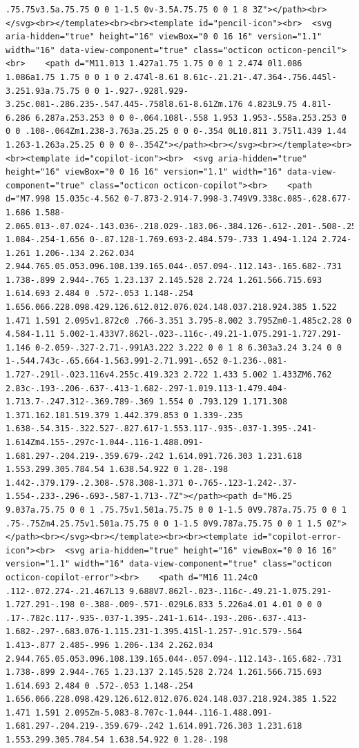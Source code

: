 \documentclass[
  letterpaper,
]{book}
\begin{document}
\begin{verbatim}
.75.75v3.5a.75.75 0 0 1-1.5 0v-3.5A.75.75 0 0 1 8 3Z"></path><br></svg><br></template><br><br><template id="pencil-icon"><br>  <svg aria-hidden="true" height="16" viewBox="0 0 16 16" version="1.1" width="16" data-view-component="true" class="octicon octicon-pencil"><br>    <path d="M11.013 1.427a1.75 1.75 0 0 1 2.474 0l1.086 1.086a1.75 1.75 0 0 1 0 2.474l-8.61 8.61c-.21.21-.47.364-.756.445l-3.251.93a.75.75 0 0 1-.927-.928l.929-3.25c.081-.286.235-.547.445-.758l8.61-8.61Zm.176 4.823L9.75 4.81l-6.286 6.287a.253.253 0 0 0-.064.108l-.558 1.953 1.953-.558a.253.253 0 0 0 .108-.064Zm1.238-3.763a.25.25 0 0 0-.354 0L10.811 3.75l1.439 1.44 1.263-1.263a.25.25 0 0 0 0-.354Z"></path><br></svg><br></template><br><br><template id="copilot-icon"><br>  <svg aria-hidden="true" height="16" viewBox="0 0 16 16" version="1.1" width="16" data-view-component="true" class="octicon octicon-copilot"><br>    <path d="M7.998 15.035c-4.562 0-7.873-2.914-7.998-3.749V9.338c.085-.628.677-1.686 1.588-2.065.013-.07.024-.143.036-.218.029-.183.06-.384.126-.612-.201-.508-.254-1.084-.254-1.656 0-.87.128-1.769.693-2.484.579-.733 1.494-1.124 2.724-1.261 1.206-.134 2.262.034 2.944.765.05.053.096.108.139.165.044-.057.094-.112.143-.165.682-.731 1.738-.899 2.944-.765 1.23.137 2.145.528 2.724 1.261.566.715.693 1.614.693 2.484 0 .572-.053 1.148-.254 1.656.066.228.098.429.126.612.012.076.024.148.037.218.924.385 1.522 1.471 1.591 2.095v1.872c0 .766-3.351 3.795-8.002 3.795Zm0-1.485c2.28 0 4.584-1.11 5.002-1.433V7.862l-.023-.116c-.49.21-1.075.291-1.727.291-1.146 0-2.059-.327-2.71-.991A3.222 3.222 0 0 1 8 6.303a3.24 3.24 0 0 1-.544.743c-.65.664-1.563.991-2.71.991-.652 0-1.236-.081-1.727-.291l-.023.116v4.255c.419.323 2.722 1.433 5.002 1.433ZM6.762 2.83c-.193-.206-.637-.413-1.682-.297-1.019.113-1.479.404-1.713.7-.247.312-.369.789-.369 1.554 0 .793.129 1.171.308 1.371.162.181.519.379 1.442.379.853 0 1.339-.235 1.638-.54.315-.322.527-.827.617-1.553.117-.935-.037-1.395-.241-1.614Zm4.155-.297c-1.044-.116-1.488.091-1.681.297-.204.219-.359.679-.242 1.614.091.726.303 1.231.618 1.553.299.305.784.54 1.638.54.922 0 1.28-.198 1.442-.379.179-.2.308-.578.308-1.371 0-.765-.123-1.242-.37-1.554-.233-.296-.693-.587-1.713-.7Z"></path><path d="M6.25 9.037a.75.75 0 0 1 .75.75v1.501a.75.75 0 0 1-1.5 0V9.787a.75.75 0 0 1 .75-.75Zm4.25.75v1.501a.75.75 0 0 1-1.5 0V9.787a.75.75 0 0 1 1.5 0Z"></path><br></svg><br></template><br><br><template id="copilot-error-icon"><br>  <svg aria-hidden="true" height="16" viewBox="0 0 16 16" version="1.1" width="16" data-view-component="true" class="octicon octicon-copilot-error"><br>    <path d="M16 11.24c0 .112-.072.274-.21.467L13 9.688V7.862l-.023-.116c-.49.21-1.075.291-1.727.291-.198 0-.388-.009-.571-.029L6.833 5.226a4.01 4.01 0 0 0 .17-.782c.117-.935-.037-1.395-.241-1.614-.193-.206-.637-.413-1.682-.297-.683.076-1.115.231-1.395.415l-1.257-.91c.579-.564 1.413-.877 2.485-.996 1.206-.134 2.262.034 2.944.765.05.053.096.108.139.165.044-.057.094-.112.143-.165.682-.731 1.738-.899 2.944-.765 1.23.137 2.145.528 2.724 1.261.566.715.693 1.614.693 2.484 0 .572-.053 1.148-.254 1.656.066.228.098.429.126.612.012.076.024.148.037.218.924.385 1.522 1.471 1.591 2.095Zm-5.083-8.707c-1.044-.116-1.488.091-1.681.297-.204.219-.359.679-.242 1.614.091.726.303 1.231.618 1.553.299.305.784.54 1.638.54.922 0 1.28-.198 
\end{verbatim}
\end{document}
